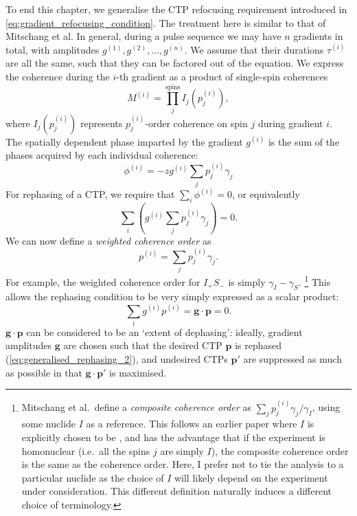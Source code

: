 To end this chapter, we generalise the CTP refocusing requirement introduced in \cref{eq:gradient_refocusing_condition}.
The treatment here is similar to that of Mitschang et al.\autocite{Mitschang1995JCP}
In general, during a pulse sequence we may have $n$ gradients in total, with amplitudes $g^{(1)}, g^{(2)}, \ldots, g^{(n)}$.
We assume that their durations $\tau^{(i)}$ are all the same, such that they can be factored out of the equation.
We express the coherence during the $i$-th gradient as a product of single-spin coherences
\begin{equation}
    \label{eq:generalised_coherence}
    M^{(i)} = \prod_j^{\text{spins}} I_j(p_j^{(i)}),
\end{equation}
where $I_j(p_j^{(i)})$ represents $p_j^{(i)}$-order coherence on spin $j$ during gradient $i$.
The spatially dependent phase imparted by the gradient $g^{(i)}$ is the sum of the phases acquired by each individual coherence:
\begin{equation}
    \label{eq:generalised_phase}
    \phi^{(i)} = -zg^{(i)} \sum_j p_j^{(i)}\gamma_j
\end{equation}
For rephasing of a CTP, we require that $\sum_i \phi^{(i)} = 0$, or equivalently
\begin{equation}
    \label{eq:generalised_rephasing_1}
    \sum_i \left( g^{(i)}\sum_j p_j^{(i)}\gamma_j\right) = 0.
\end{equation}
We can now define a \textit{weighted coherence order}\autocite{John1991JMR} as
\begin{equation}
    \label{eq:weighted_coherence_order}
    p^{(i)} = \sum_j p_j^{(i)}\gamma_j.
\end{equation}
For example, the weighted coherence order for $I_+S_-$ is simply $\gamma_I - \gamma_S$.%
\footnote{Mitschang et al.\ define a \textit{composite coherence order} as $\sum_j p_j^{(i)}\gamma_j/\gamma_I$, using some nuclide $I$ as a reference. This follows an earlier paper\autocite{John1991JMR} where $I$ is explicitly chosen to be \proton{}, and has the advantage that if the experiment is homonuclear (i.e.\ all the spins $j$ are simply $I$), the composite coherence order is the same as the coherence order. Here, I prefer not to tie the analysis to a particular nuclide as the choice of $I$ will likely depend on the experiment under consideration. This different definition naturally induces a different choice of terminology.}
This allows the rephasing condition to be very simply expressed as a scalar product:
\begin{equation}
    \label{eq:generalised_rephasing_2}
    \sum_i g^{(i)} p^{(i)} = \symbf{g} \cdot \symbf{p} = 0.
\end{equation}
$\symbf{g} \cdot \symbf{p}$ can be considered to be an `extent of dephasing': ideally, gradient amplitudes $\symbf{g}$ are chosen such that the desired CTP $\symbf{p}$ is rephased (\cref{eq:generalised_rephasing_2}), and undesired CTPs $\symbf{p'}$ are suppressed as much as possible in that $\symbf{g} \cdot \symbf{p'}$ is maximised.
